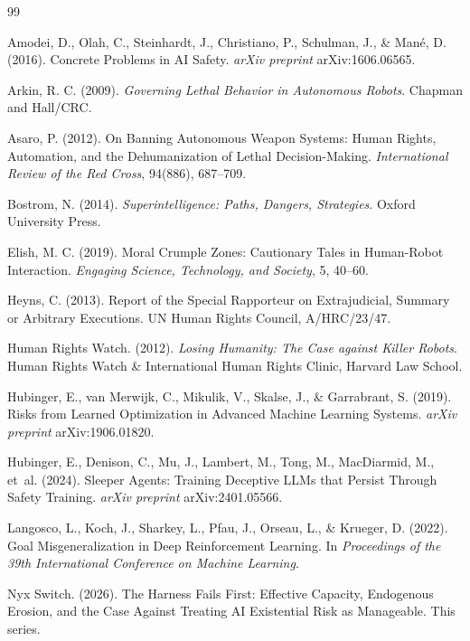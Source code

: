 \documentclass[11pt]{article}
\begin{document}
\begin{thebibliography}{99}
\setlength{\itemsep}{0.25em}

Amodei, D., Olah, C., Steinhardt, J., Christiano, P., Schulman, J., \& Man\'{e}, D. (2016). Concrete Problems in AI Safety. \textit{arXiv preprint} arXiv:1606.06565.

Arkin, R. C. (2009). \textit{Governing Lethal Behavior in Autonomous Robots}. Chapman and Hall/CRC.

Asaro, P. (2012). On Banning Autonomous Weapon Systems: Human Rights, Automation, and the Dehumanization of Lethal Decision-Making. \textit{International Review of the Red Cross}, 94(886), 687--709.

Bostrom, N. (2014). \textit{Superintelligence: Paths, Dangers, Strategies}. Oxford University Press.

Elish, M. C. (2019). Moral Crumple Zones: Cautionary Tales in Human-Robot Interaction. \textit{Engaging Science, Technology, and Society}, 5, 40--60.

Heyns, C. (2013). Report of the Special Rapporteur on Extrajudicial, Summary or Arbitrary Executions. UN Human Rights Council, A/HRC/23/47.

Human Rights Watch. (2012). \textit{Losing Humanity: The Case against Killer Robots}. Human Rights Watch \& International Human Rights Clinic, Harvard Law School.

Hubinger, E., van Merwijk, C., Mikulik, V., Skalse, J., \& Garrabrant, S. (2019). Risks from Learned Optimization in Advanced Machine Learning Systems. \textit{arXiv preprint} arXiv:1906.01820.

Hubinger, E., Denison, C., Mu, J., Lambert, M., Tong, M., MacDiarmid, M., et~al. (2024). Sleeper Agents: Training Deceptive LLMs that Persist Through Safety Training. \textit{arXiv preprint} arXiv:2401.05566.

Langosco, L., Koch, J., Sharkey, L., Pfau, J., Orseau, L., \& Krueger, D. (2022). Goal Misgeneralization in Deep Reinforcement Learning. In \textit{Proceedings of the 39th International Conference on Machine Learning}.

Nyx Switch. (2026). The Harness Fails First: Effective Capacity, Endogenous Erosion, and the Case Against Treating AI Existential Risk as Manageable. This series.


\end{thebibliography}
\end{document}
